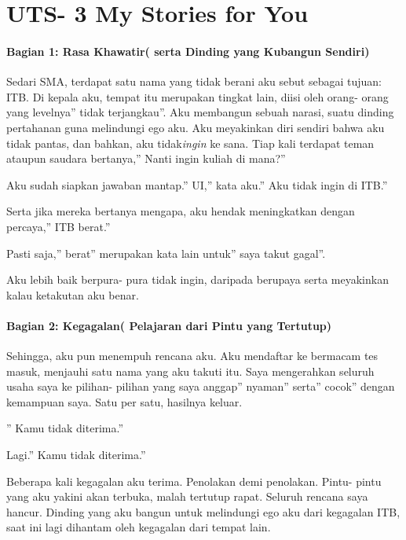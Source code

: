 \documentclass[
  letterpaper,
  DIV=11,
  numbers=noendperiod]{scrreprt}
\begin{document}

\chapter{UTS- 3 My Stories for You}\label{uts--3-my-stories-for-you}

\subsubsection{Bagian 1: Rasa Khawatir( serta Dinding yang Kubangun
Sendiri)}\label{bagian-1-rasa-khawatir-serta-dinding-yang-kubangun-sendiri}

Sedari SMA, terdapat satu nama yang tidak berani aku sebut sebagai
tujuan: ITB. Di kepala aku, tempat itu merupakan tingkat lain, diisi
oleh orang- orang yang levelnya'' tidak terjangkau''. Aku membangun
sebuah narasi, suatu dinding pertahanan guna melindungi ego aku. Aku
meyakinkan diri sendiri bahwa aku tidak pantas, dan bahkan, aku
tidak\emph{ingin} ke sana. Tiap kali terdapat teman ataupun saudara
bertanya,'' Nanti ingin kuliah di mana?''

Aku sudah siapkan jawaban mantap.'' UI,'' kata aku.'' Aku tidak ingin di
ITB.''

Serta jika mereka bertanya mengapa, aku hendak meningkatkan dengan
percaya,'' ITB berat.''

Pasti saja,'' berat'' merupakan kata lain untuk'' saya takut gagal''.

Aku lebih baik berpura- pura tidak ingin, daripada berupaya serta
meyakinkan kalau ketakutan aku benar.

\subsubsection{Bagian 2: Kegagalan( Pelajaran dari Pintu yang
Tertutup)}\label{bagian-2-kegagalan-pelajaran-dari-pintu-yang-tertutup}

Sehingga, aku pun menempuh rencana aku. Aku mendaftar ke bermacam tes
masuk, menjauhi satu nama yang aku takuti itu. Saya mengerahkan seluruh
usaha saya ke pilihan- pilihan yang saya anggap'' nyaman'' serta''
cocok'' dengan kemampuan saya. Satu per satu, hasilnya keluar.

'' Kamu tidak diterima.''

Lagi.'' Kamu tidak diterima.''

Beberapa kali kegagalan aku terima. Penolakan demi penolakan. Pintu-
pintu yang aku yakini akan terbuka, malah tertutup rapat. Seluruh
rencana saya hancur. Dinding yang aku bangun untuk melindungi ego aku
dari kegagalan ITB, saat ini lagi dihantam oleh kegagalan dari tempat
lain.
\end{document}
